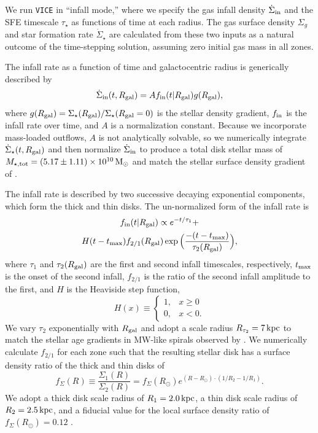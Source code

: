 \documentclass[twocolumn,twocolappendix]{aastex701}
\newcommand{\kpc}{\,{\rm kpc}}
\begin{document}
We run {\tt VICE} in ``infall mode,'' where we specify the gas infall density $\dot\Sigma_{\rm in}$ and the SFE timescale $\tau_\star$ as functions of time at each radius. The gas surface density $\Sigma_g$ and star formation rate $\dot\Sigma_\star$ are calculated from these two inputs as a natural outcome of the time-stepping solution, assuming zero initial gas mass in all zones.

The infall rate as a function of time and galactocentric radius is generically described by
\begin{equation}
    \label{eq:infall-rate}
    \dot\Sigma_{\rm in}(t,R_{\rm gal}) = A f_{\rm in}(t|R_{\rm gal}) g(R_{\rm gal}),
\end{equation}
where $g(R_{\rm gal})=\Sigma_\star(R_{\rm gal}) / \Sigma_\star(R_{\rm gal}=0)$ is the stellar density gradient, $f_{\rm in}$ is the infall rate over time, and $A$ is a normalization constant. Because we incorporate mass-loaded outflows, $A$ is not analytically solvable, so we numerically integrate $\dot\Sigma_\star(t,R_{\rm gal})$ and then normalize $\dot\Sigma_{\rm in}$ to produce a total disk stellar mass of $M_{\rm \star,tot}=(5.17\pm1.11)\times 10^{10}\,{\rm M}_\odot$ \citep{licquia_improved_2015} and match the stellar surface density gradient of \citet{bland-hawthorn_galaxy_2016}.

The infall rate is described by two successive decaying exponential components, which form the thick and thin disks. The un-normalized form of the infall rate is
\begin{multline}
    \label{eq:twoinfall-ifr}
    f_{\rm in}(t|R_{\rm gal}) \propto e^{-t/\tau_1} + \\ H(t-t_{\rm max}) f_{2/1} (R_{\rm gal}) \exp\Big(\frac{-(t-t_{\rm max})}{\tau_2(R_{\rm gal})}\Big),
\end{multline}
where $\tau_1$ and $\tau_2(R_{\rm gal})$ are the first and second infall timescales, respectively, $t_{\rm max}$ is the onset of the second infall, $f_{2/1}$ is the ratio of the second infall amplitude to the first, and $H$ is the Heaviside step function,
\begin{equation*}
    H(x) \equiv 
    \begin{cases}
        1, & x \ge 0 \\
        0, & x < 0.
    \end{cases}
\end{equation*}
We vary $\tau_2$ exponentially with $R_{\rm gal}$ and adopt a scale radius $R_{\tau_2}=7\kpc$ to match the stellar age gradients in MW-like spirals observed by \citet{sanchez_spatially_2020}. We numerically calculate $f_{2/1}$ for each zone such that the resulting stellar disk has a surface density ratio of the thick and thin disks of
\begin{equation}
    f_\Sigma(R) \equiv \frac{\Sigma_1(R)}{\Sigma_2(R)} = f_\Sigma(R_\odot) e^{(R-R_\odot)\cdot(1/R_2 - 1/R_1)}.
\end{equation}
We adopt a thick disk scale radius of $R_1=2.0\kpc$, a thin disk scale radius of $R_2=2.5\kpc$, and a fiducial value for the local surface density ratio of $f_\Sigma(R_\odot)=0.12$ \citep{bland-hawthorn_galaxy_2016}. 
\end{document}
